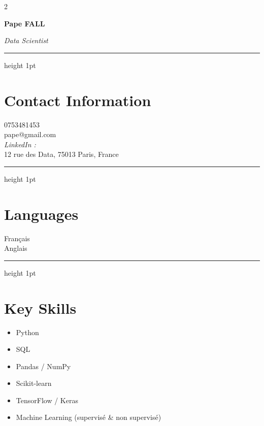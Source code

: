 \documentclass[10pt,letterpaper]{article}
\newcommand{\cvName}[1]{\vspace*{0.3in}\textbf{\LARGE #1}}
\newcommand{\cvHeadline}[1]{\par\smallskip\textit{#1}}
\newcommand{\cvHr}{\vspace{0.5\baselineskip}\hrule height 1pt\color{primary}\vspace{0.7\baselineskip}}
\begin{document}
\begin{paracol}{2}

\begin{leftcolumn}
\begin{center}
\end{center}

\vspace{0.6in}

\cvName{Pape FALL}
\cvHeadline{Data Scientist}

\cvHr

\section*{Contact Information}
0753481453\\
pape@gmail.com\\
\textit{LinkedIn :} \\
12 rue des Data, 75013 Paris, France\\

\cvHr

\section*{Languages}
Français\\
Anglais

\cvHr

\section*{Key Skills}
\begin{itemize}
  \item Python
  \item SQL
  \item Pandas / NumPy
  \item Scikit-learn
  \item TensorFlow / Keras
  \item Machine Learning (supervisé \& non supervisé)
\end{itemize}


\end{leftcolumn}
\end{paracol}
\end{document}
